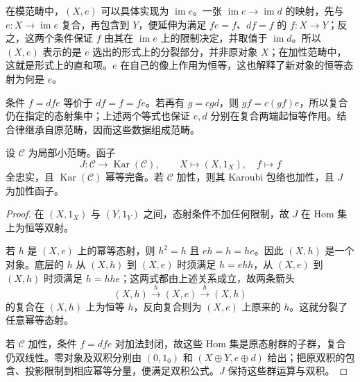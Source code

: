 在模范畴中，\((X,e)\) 可以具体实现为 \(\operatorname{im}e\)。一张 \(\operatorname{im}e\to\operatorname{im}d\) 的映射，先与 \(e:X\to\operatorname{im}e\) 复合，再包含到 \(Y\)，便延伸为满足 \(fe=f\)、\(df=f\) 的 \(f:X\to Y\)；反之，这两个条件保证 \(f\) 由其在 \(\operatorname{im}e\) 上的限制决定，并取值于 \(\operatorname{im}d\)。所以 \((X,e)\) 表示的是 \(e\) 选出的形式上的分裂部分，并非原对象 \(X\)；在加性范畴中，这就是形式上的直和项。\(e\) 在自己的像上作用为恒等，这也解释了新对象的恒等态射为何是 \(e\)。

\ProseParagraphBreak
条件 \(f=dfe\) 等价于 \(df=f=fe\)。若再有 \(g=cgd\)，则 \(gf=c(gf)e\)，所以复合仍在指定的态射集中；上述两个等式也保证 \(e,d\) 分别在复合两端起恒等作用。结合律继承自原范畴，因而这些数据组成范畴。

\begin{proposition}\label{b4:prop:karoubi-splitting}
	设 \(\mathcal C\) 为局部小范畴。函子
	\[
		J:\mathcal C\longrightarrow\operatorname{Kar}(\mathcal C), \qquad X\longmapsto(X,1_X),\quad f\longmapsto f
	\]
	全忠实，且 \(\operatorname{Kar}(\mathcal C)\) 幂等完备。若 \(\mathcal C\) 加性，则其 Karoubi 包络也加性，且 \(J\) 为加性函子。
\end{proposition}
\begin{proof}
	在 \((X,1_X)\) 与 \((Y,1_Y)\) 之间，态射条件不加任何限制，故 \(J\) 在 Hom 集上为恒等双射。

	若 \(h\) 是 \((X,e)\) 上的幂等态射，则 \(h^2=h\) 且 \(eh=h=he\)。因此 \((X,h)\) 是一个对象。底层的 \(h\) 从 \((X,h)\) 到 \((X,e)\) 时须满足 \(h=ehh\)，从 \((X,e)\) 到 \((X,h)\) 时须满足 \(h=hhe\)；这两式都由上述关系成立，故两条箭头
	\[
		(X,h)\xrightarrow{h}(X,e)\xrightarrow{h}(X,h)
	\]
	的复合在 \((X,h)\) 上为恒等 \(h\)，反向复合则为 \((X,e)\) 上原来的 \(h\)。这就分裂了任意幂等态射。

	若 \(\mathcal C\) 加性，条件 \(f=dfe\) 对加法封闭，故这些 Hom 集是原态射群的子群，复合仍双线性。零对象及双积分别由 \((0,1_0)\) 和 \((X\oplus Y,e\oplus d)\) 给出；把原双积的包含、投影限制到相应幂等分量，便满足双积公式。\(J\) 保持这些群运算与双积。
\end{proof}

